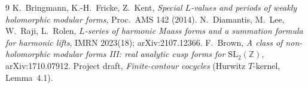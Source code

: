 \documentclass[11pt]{article}
\theoremstyle{definition}
\theoremstyle{remark}
\newcommand{\ZZ}{\mathbb{Z}}
\newcommand{\SLZ}{\mathrm{SL}_2(\ZZ)}
\begin{document}
\begin{thebibliography}{9}
 K.~Bringmann, K.-H.~Fricke, Z.~Kent, \emph{Special $L$-values and periods of weakly
holomorphic modular forms}, Proc.\ AMS 142 (2014).
 N.~Diamantis, M.~Lee, W.~Raji, L.~Rolen, \emph{$L$-series of harmonic Maass forms and a
summation formula for harmonic lifts}, IMRN 2023(18); arXiv:2107.12366.
 F.~Brown, \emph{A class of non-holomorphic modular forms III: real analytic cusp forms
for $\SLZ$}, arXiv:1710.07912.
 Project draft, \emph{Finite-contour cocycles} (Hurwitz $T$-kernel, Lemma~4.1).
\end{thebibliography}
\end{document}
